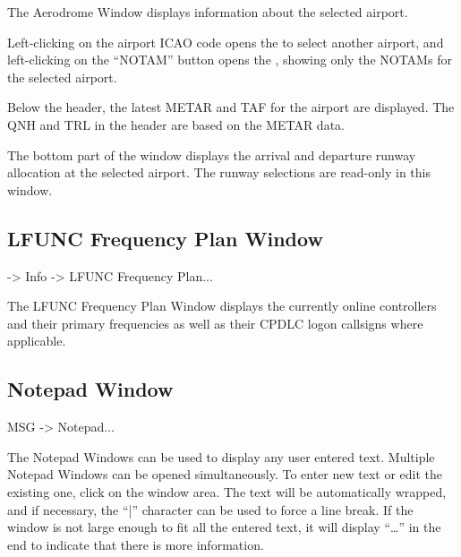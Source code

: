 \documentclass[a4paper,oneside,11pt]{memoir}
\begin{document}
\bigskip


The Aerodrome Window displays information about the selected airport.

\bigskip

Left-clicking on the airport ICAO code opens the  to select another airport, and left-clicking on the “NOTAM” button opens the , showing only the NOTAMs for the selected airport.

\bigskip

Below the header, the latest METAR and TAF for the airport are displayed. The QNH and TRL in the header are based on the METAR data.

\bigskip

The bottom part of the window displays the arrival and departure runway allocation at the selected airport. The runway selections are read-only in this window.

\subsection{LFUNC Frequency Plan Window}
\label{win:lfunc}

 -> Info -> LFUNC Frequency Plan...

\bigskip


The LFUNC Frequency Plan Window displays the currently online controllers and their primary frequencies as well as their CPDLC logon callsigns where applicable.

\subsection{Notepad Window}
\label{win:note}

 MSG -> Notepad...

\bigskip


The Notepad Windows can be used to display any user entered text. Multiple Notepad Windows can be opened simultaneously. To enter new text or edit the existing one, click on the window area. The text will be automatically wrapped, and if necessary, the “|” character can be used to force a line break. If the window is not large enough to fit all the entered text, it will display “…” in the end to indicate that there is more information.
\end{document}
